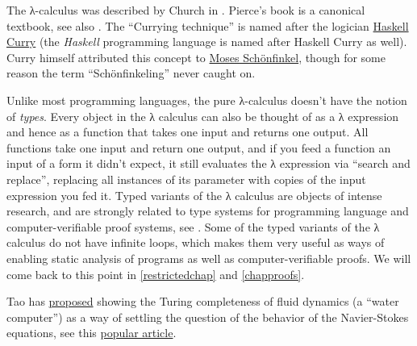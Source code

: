 The λ-calculus was described by Church in \cite{church1941}. Pierce's
book \cite{pierce2002types} is a canonical textbook, see also
\cite{barendregt1984}. The ``Currying technique'' is named after the
logician \href{https://goo.gl/C9hKz1}{Haskell Curry} (the \emph{Haskell}
programming language is named after Haskell Curry as well). Curry
himself attributed this concept to \href{https://goo.gl/qJqd47}{Moses
Schönfinkel}, though for some reason the term ``Schönfinkeling'' never
caught on.

Unlike most programming languages, the pure λ-calculus doesn't have the
notion of \emph{types}. Every object in the λ calculus can also be
thought of as a λ expression and hence as a function that takes one
input and returns one output. All functions take one input and return
one output, and if you feed a function an input of a form it didn't
expect, it still evaluates the λ expression via ``search and replace'',
replacing all instances of its parameter with copies of the input
expression you fed it. Typed variants of the λ calculus are objects of
intense research, and are strongly related to type systems for
programming language and computer-verifiable proof systems, see
\cite{pierce2002types}. Some of the typed variants of the λ calculus do
not have infinite loops, which makes them very useful as ways of
enabling static analysis of programs as well as computer-verifiable
proofs. We will come back to this point in \cref{restrictedchap} and
\cref{chapproofs}.

Tao has
\href{https://terrytao.wordpress.com/2014/02/04/finite-time-blowup-for-an-averaged-three-dimensional-navier-stokes-equation/}{proposed}
showing the Turing completeness of fluid dynamics (a ``water computer'')
as a way of settling the question of the behavior of the Navier-Stokes
equations, see this
\href{https://www.quantamagazine.org/terence-tao-proposes-fluid-new-path-in-navier-stokes-problem-20140224/}{popular
article}.
